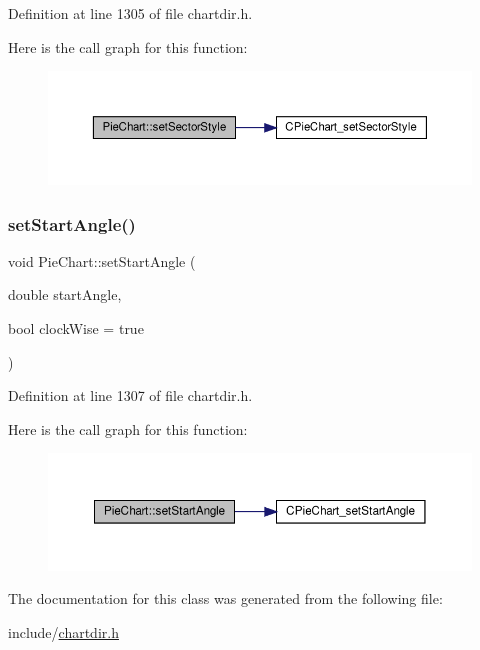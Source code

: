 Definition at line 1305 of file chartdir.\+h.

Here is the call graph for this function\+:
\nopagebreak
\begin{figure}[H]
\begin{center}
\leavevmode
\includegraphics[width=350pt]{class_pie_chart_aafa4b3350c1242f624c99fad5fbb3883_cgraph}
\end{center}
\end{figure}
\mbox{\label{class_pie_chart_a3a0283233ab280df46c79c25d0770437}} 
\subsubsection{\texorpdfstring{set\+Start\+Angle()}{setStartAngle()}}
{\footnotesize\ttfamily void Pie\+Chart\+::set\+Start\+Angle (\begin{DoxyParamCaption}\item[{double}]{start\+Angle,  }\item[{bool}]{clock\+Wise = {\ttfamily true} }\end{DoxyParamCaption})\hspace{0.3cm}{\ttfamily [inline]}}



Definition at line 1307 of file chartdir.\+h.

Here is the call graph for this function\+:
\nopagebreak
\begin{figure}[H]
\begin{center}
\leavevmode
\includegraphics[width=350pt]{class_pie_chart_a3a0283233ab280df46c79c25d0770437_cgraph}
\end{center}
\end{figure}


The documentation for this class was generated from the following file\+:\begin{DoxyCompactItemize}
\item 
include/\hyperlink{chartdir_8h}{chartdir.\+h}\end{DoxyCompactItemize}
